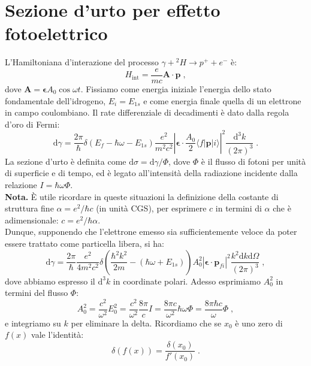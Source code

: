 \documentclass[10pt,a4paper]{report}
\theoremstyle{definition}
\numberwithin{equation}{section}
\newcommand{\diff}[1][]{\mathrm{d}#1}
\newcommand{\bra}{\langle}
\newcommand{\ket}{\rangle}
\begin{document}
\section{Sezione d'urto per effetto fotoelettrico}
L'Hamiltoniana d'interazione del processo $\gamma+{}^2H\rightarrow p^+ +e^-$ è:
\begin{equation}
H_{\mathrm{int}}=\frac{e}{mc}\mathbf{A}\cdot\mathbf{p}\;,
\end{equation}
dove $\mathbf{A}=\boldsymbol{\epsilon}A_0\cos\omega t$. Fissiamo come energia iniziale l'energia dello stato fondamentale dell'idrogeno, $E_i=E_{1s}$ e come energia finale quella di un elettrone in campo coulombiano. Il rate differenziale di decadimenti è dato dalla regola d'oro di Fermi:
\begin{equation}
\diff{\gamma}=\frac{2\pi}{\hbar}\delta(E_f-\hbar\omega-E_{1s})\frac{e^2}{m^2c^2}\left|\boldsymbol{\epsilon}\cdot\frac{A_0}{2}\bra f|\mathbf{p}|i\ket\right|^2\frac{\diff^3{k}}{(2\pi)^3}\;.
\end{equation}
La sezione d'urto è definita come $\diff{\sigma}=\diff{\gamma}/\Phi$, dove $\Phi$ è il flusso di fotoni per unità di superficie e di tempo, ed è legato all'intensità della radiazione incidente dalla relazione $I=\hbar\omega \Phi$. \\
\textbf{Nota.} È utile ricordare in queste situazioni la definizione della costante di struttura fine $\alpha=e^2/\hbar c$ (in unità CGS), per esprimere $c$ in termini di $\alpha$ che è adimensionale: $c=e^2/\hbar\alpha$. \\
Dunque, supponendo che l'elettrone emesso sia sufficientemente veloce da poter essere trattato come particella libera, si ha:
\begin{equation}
\diff{\gamma}=\frac{2\pi}{\hbar}\frac{e^2}{4m^2c^2}\delta\left(\frac{\hbar^2k^2}{2m}-(\hbar\omega+E_{1s})\right)A_0^2|\boldsymbol{\epsilon}\cdot\mathbf{p}_{fi}|^2\frac{k^2\diff{k}\diff{\Omega}}{(2\pi)^3}\;,
\end{equation}
dove abbiamo espresso il $\diff^3{k}$ in coordinate polari. Adesso esprimiamo $A_0^2$ in termini del flusso $\Phi$:
\begin{equation}
A_0^2=\frac{c^2}{\omega^2}E_0^2=\frac{c^2}{\omega^2}\frac{8\pi}{c}I=\frac{8\pi c}{\omega^2}\hbar\omega\Phi=\frac{8\pi\hbar c}{\omega}\Phi\;,
\end{equation}
e integriamo su $k$ per eliminare la delta. Ricordiamo che se $x_0$ è uno zero di $f(x)$ vale l'identità:
\begin{equation}
\delta(f(x))=\frac{\delta(x_0)}{f'(x_0)}\;.
\end{equation}
\end{document}
